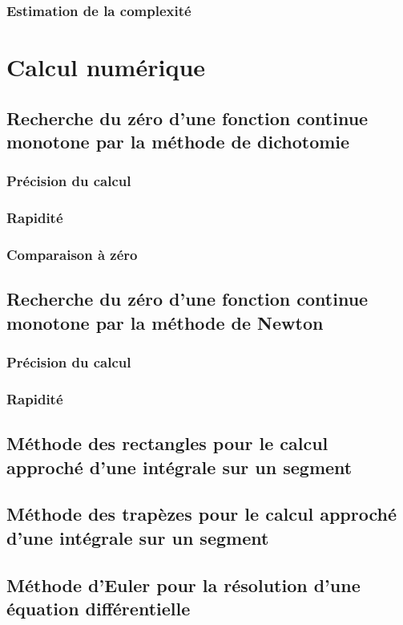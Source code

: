 \documentclass[10pt]{article}
\begin{document}
\subsubsection*{Estimation de la complexité}

\section{Calcul numérique}
\subsection{Recherche du zéro d'une fonction continue monotone par la méthode de dichotomie}
\subsubsection*{Précision du calcul}
\subsubsection*{Rapidité}
\subsubsection*{Comparaison à zéro}

\subsection{Recherche du zéro d'une fonction continue monotone par la méthode de Newton}
\subsubsection*{Précision du calcul}
\subsubsection*{Rapidité}

\subsection{Méthode des rectangles pour le calcul approché d'une intégrale sur un segment}
\subsection{Méthode des trapèzes pour le calcul approché d'une intégrale sur un segment}

\subsection{Méthode d'Euler pour la résolution d'une équation différentielle}
\end{document}
